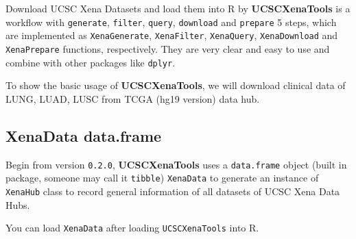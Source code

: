 \documentclass[nofonts,]{tufte-handout}
\begin{document}
Download UCSC Xena Datasets and load them into R by
\textbf{UCSCXenaTools} is a workflow with \texttt{generate},
\texttt{filter}, \texttt{query}, \texttt{download} and \texttt{prepare}
5 steps, which are implemented as \texttt{XenaGenerate},
\texttt{XenaFilter}, \texttt{XenaQuery}, \texttt{XenaDownload} and
\texttt{XenaPrepare} functions, respectively. They are very clear and
easy to use and combine with other packages like \texttt{dplyr}.

To show the basic usage of \textbf{UCSCXenaTools}, we will download
clinical data of LUNG, LUAD, LUSC from TCGA (hg19 version) data hub.

\hypertarget{xenadata-data.frame}{%
\subsection{XenaData data.frame}\label{xenadata-data.frame}}

Begin from version \texttt{0.2.0}, \textbf{UCSCXenaTools} uses a
\texttt{data.frame} object (built in package, someone may call it
\texttt{tibble}) \texttt{XenaData} to generate an instance of
\texttt{XenaHub} class to record general information of all datasets of
UCSC Xena Data Hubs.

You can load \texttt{XenaData} after loading \texttt{UCSCXenaTools} into
R.
\end{document}
